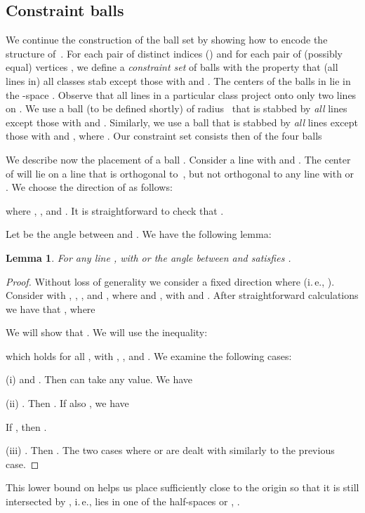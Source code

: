\documentclass[12pt]{article}
\newtheorem{lemma}[definition]{Lemma}
\begin{document}
\subsection{Constraint balls}

We continue the construction of the ball set  by showing how
to encode the structure of~.  For each pair of distinct indices  () and for each pair of (possibly equal) vertices
, we define a \emph{constraint set}  of balls
with the property that (all lines in) all classes  stab
 except those with  and . The centers
of the balls in  lie in the -space . Observe that all lines in a particular class  project onto
only two lines on .
We use a ball  (to be defined shortly) of radius~ that is stabbed by \emph{all} lines  except those 
with  and .
Similarly, we use a ball  that is stabbed by \emph{all} lines  except those 
with  and , where . 
Our constraint set consists then of the four balls



We describe now the placement of a ball . Consider a line  with 
 and . The center  of  will lie on a line  that is
orthogonal to~, but not orthogonal to any line  with 
 or . We choose the direction
 of  as follows: 
 

where , , and . 
It is straightforward to check that .

Let  
be the angle between  and . 
We have the following lemma: 
\begin{lemma}
\label{omega_bound}
For any line , with  or  the angle  
between  and  satisfies .
\end{lemma}
\begin{proof}
Without loss of generality we consider a fixed direction  where  (i.\,e., ).
Consider  with , , , and 
, where  and , with  and 
. After straightforward calculations we have that
, where 

We will show that . We will use the inequality:

which holds for all , with , , and .
We examine the following cases:

(i)  and . Then  can take any value.
We have 


(ii) . Then . If also , we have
 
If , then .

(iii) . Then . The two cases where  or  are dealt with similarly to the previous case.
\end{proof}
This lower bound on  helps us 
place  sufficiently close to the origin so that it is still intersected by , i.\,e., 
 lies in one of the half-spaces 
 or , 
.
\end{document}
